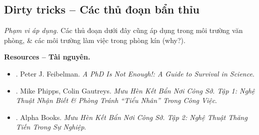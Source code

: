 \documentclass[12pt]{article}
\begin{document}
\subsection{Dirty tricks -- Các thủ đoạn bẩn thỉu}
{\it Phạm vi áp dụng.} Các thủ đoạn dưới đây cũng áp dụng trong môi trường văn phòng, \& các môi trường làm việc trong phòng kín (why?).

\noindent\textbf{\textsf{Resources -- Tài nguyên.}}
\begin{itemize}
	\item \cite{Feibelman2011}. {\sc Peter J. Feibelman}. {\it A PhD Is Not Enough!: A Guide to Survival in Science}.
	\item \cite{Phipps_Gautreys_muu_hen_ke_ban_tap_1}. {\sc Mike Phipps, Colin Gautreys}. {\it Mưu Hèn Kết Bẩn Nơi Công Sở. Tập 1: Nghệ Thuật Nhận Biết \& Phòng Tránh ``Tiểu Nhân'' Trong Công Việc}.
	\item \cite{muu_hen_ke_ban_tap_2}. Alpha Books. {\it Mưu Hèn Kết Bẩn Nơi Công Sở. Tập 2: Nghệ Thuật Thăng Tiến Trong Sự Nghiệp}.
\end{itemize}
\end{document}
